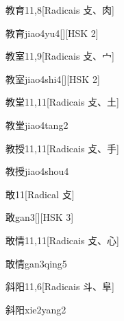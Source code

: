 \begin{entry}{教育}{11,8}[Radicais ⽁、⾁]
  \begin{phonetics}{教育}{jiao4yu4}[][HSK 2]
  \end{phonetics}
\end{entry}

\begin{entry}{教室}{11,9}[Radicais ⽁、⼧]
  \begin{phonetics}{教室}{jiao4shi4}[][HSK 2]
  \end{phonetics}
\end{entry}

\begin{entry}{教堂}{11,11}[Radicais ⽁、⼟]
  \begin{phonetics}{教堂}{jiao4tang2}
  \end{phonetics}
\end{entry}

\begin{entry}{教授}{11,11}[Radicais ⽁、⼿]
  \begin{phonetics}{教授}{jiao4shou4}
  \end{phonetics}
\end{entry}

\begin{entry}{敢}{11}[Radical ⽁]
  \begin{phonetics}{敢}{gan3}[][HSK 3]
  \end{phonetics}
\end{entry}

\begin{entry}{敢情}{11,11}[Radicais ⽁、⼼]
  \begin{phonetics}{敢情}{gan3qing5}
  \end{phonetics}
\end{entry}

\begin{entry}{斜阳}{11,6}[Radicais ⽃、⾩]
  \begin{phonetics}{斜阳}{xie2yang2}
  \end{phonetics}
\end{entry}

